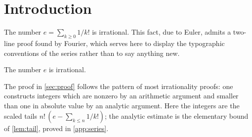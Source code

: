 \section{Introduction}\label{sec:introduction}

The number $e=\sum_{k\ge0}1/k!$ is irrational. This fact, due to Euler, admits a
two-line proof found by Fourier, which serves here to display the typographic
conventions of the series rather than to say anything new.

\begin{theorem}\label{thm:main}
The number $e$ is irrational.
\end{theorem}

The proof in \cref{sec:proof} follows the pattern of most irrationality proofs: one
constructs integers which are nonzero by an arithmetic argument and smaller than one in
absolute value by an analytic argument. Here the integers are the scaled tails
$n!\,(e-\sum_{k\le n}1/k!)$; the analytic estimate is the elementary bound of
\cref{lem:tail}, proved in \cref{app:series}.

